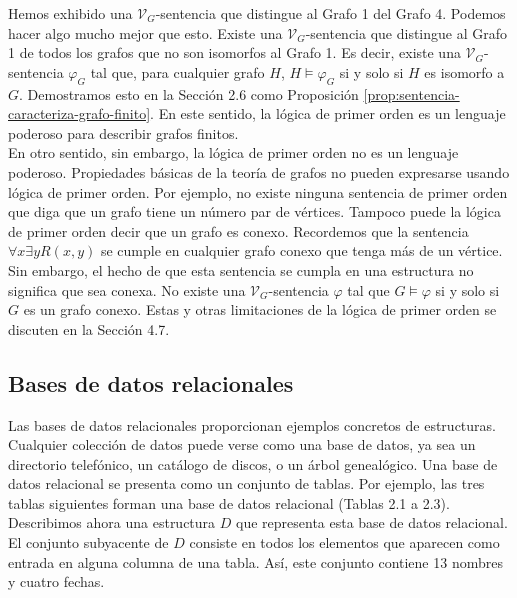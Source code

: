 \message{ !name(main.tex)}\documentclass[12pt,a4paper]{book}
\newcommand{\VV}{\mathcal{V}}
\begin{document}
    Hemos exhibido una $\VV_{G}$-sentencia que distingue al Grafo 1 del Grafo 4. Podemos hacer algo mucho mejor que esto.
    Existe una $\VV_{G}$-sentencia que distingue al Grafo 1 de todos los grafos que no son isomorfos al Grafo 1. Es decir,
    existe una $\VV_{G}$-sentencia $\varphi_{G}$ tal que, para cualquier grafo $H$, $H\models\varphi_{G}$ si y solo si $H$
    es isomorfo a $G$. Demostramos esto en la Sección 2.6 como Proposición \ref{prop:sentencia-caracteriza-grafo-finito}. En
    este sentido, la lógica de primer orden es un lenguaje poderoso para describir grafos finitos.\\
    En otro sentido, sin embargo, la lógica de primer orden no es un lenguaje poderoso. Propiedades básicas de la teoría de
    grafos no pueden expresarse usando lógica de primer orden. Por ejemplo, no existe ninguna sentencia de primer orden que
    diga que un grafo tiene un número par de vértices. Tampoco puede la lógica de primer orden decir que un grafo es
    conexo. Recordemos que la sentencia $\forall x\exists yR(x,y)$ se cumple en cualquier grafo conexo que tenga más de un
    vértice. Sin embargo, el hecho de que esta sentencia se cumpla en una estructura no significa que sea conexa. No existe
    una $\VV_{G}$-sentencia $\varphi$ tal que $G\models\varphi$ si y solo si $G$ es un grafo conexo. Estas y otras
    limitaciones de la lógica de primer orden se discuten en la Sección 4.7.

    \subsection{Bases de datos relacionales}

    Las bases de datos relacionales proporcionan ejemplos concretos de estructuras. Cualquier colección de datos puede
    verse como una base de datos, ya sea un directorio telefónico, un catálogo de discos, o un árbol genealógico. Una base
    de datos relacional se presenta como un conjunto de tablas. Por ejemplo, las tres tablas siguientes forman una base de
    datos relacional (Tablas 2.1 a 2.3).\\
    Describimos ahora una estructura $D$ que representa esta base de datos relacional. El conjunto subyacente de $D$
    consiste en todos los elementos que aparecen como entrada en alguna columna de una tabla. Así, este conjunto contiene
    13 nombres y cuatro fechas.
\end{document}
